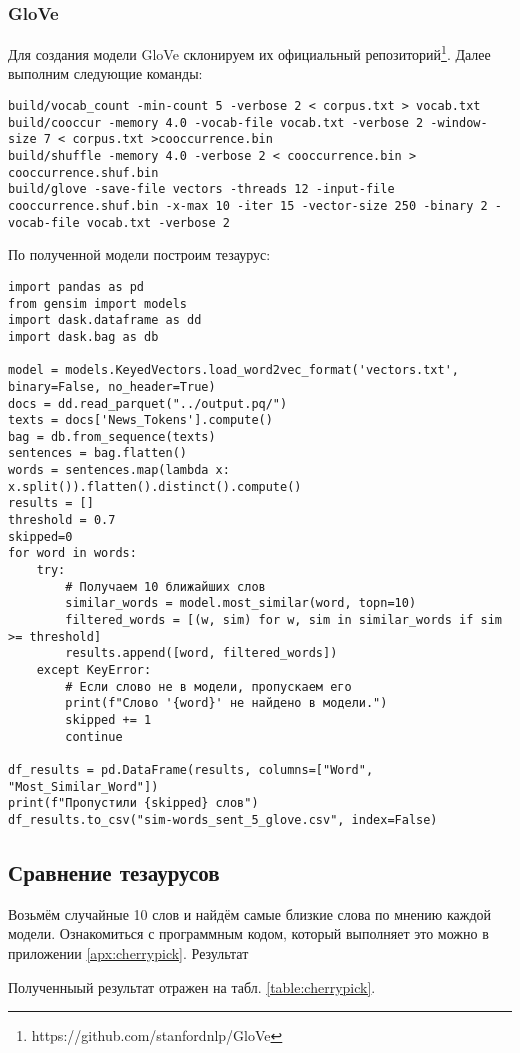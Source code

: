 \documentclass[coursework]{SCWorks}
\begin{document}
\subsubsection{GloVe}
Для создания модели GloVe склонируем их официальный репозиторий\footnote{https://github.com/stanfordnlp/GloVe}. Далее выполним следующие команды:
\begin{verbatim}
build/vocab_count -min-count 5 -verbose 2 < corpus.txt > vocab.txt
build/cooccur -memory 4.0 -vocab-file vocab.txt -verbose 2 -window-size 7 < corpus.txt >cooccurrence.bin
build/shuffle -memory 4.0 -verbose 2 < cooccurrence.bin > cooccurrence.shuf.bin
build/glove -save-file vectors -threads 12 -input-file cooccurrence.shuf.bin -x-max 10 -iter 15 -vector-size 250 -binary 2 -vocab-file vocab.txt -verbose 2
\end{verbatim}

По полученной модели построим тезаурус:
\begin{verbatim}
import pandas as pd
from gensim import models
import dask.dataframe as dd
import dask.bag as db

model = models.KeyedVectors.load_word2vec_format('vectors.txt', binary=False, no_header=True)
docs = dd.read_parquet("../output.pq/")
texts = docs['News_Tokens'].compute()
bag = db.from_sequence(texts)
sentences = bag.flatten()
words = sentences.map(lambda x: x.split()).flatten().distinct().compute()
results = []
threshold = 0.7
skipped=0
for word in words:
    try:
        # Получаем 10 ближайших слов
        similar_words = model.most_similar(word, topn=10)
        filtered_words = [(w, sim) for w, sim in similar_words if sim >= threshold]
        results.append([word, filtered_words])
    except KeyError:
        # Если слово не в модели, пропускаем его
        print(f"Слово '{word}' не найдено в модели.")
        skipped += 1
        continue

df_results = pd.DataFrame(results, columns=["Word", "Most_Similar_Word"])
print(f"Пропустили {skipped} слов")
df_results.to_csv("sim-words_sent_5_glove.csv", index=False)
\end{verbatim}
\subsection{Сравнение тезаурусов}
Возьмём случайные 10 слов и найдём самые близкие слова по мнению каждой модели. Ознакомиться с программным кодом, который выполняет это можно в приложении \ref{apx:cherrypick}. Результат 

Полученныый результат отражен на табл. \ref{table:cherrypick}.
\end{document}
